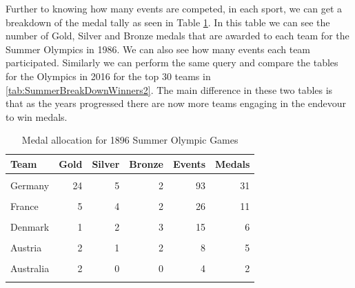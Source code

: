 \documentclass[
]{article}
\begin{document}
\newpage

Further to knowing how many events are competed, in each sport, we can get a breakdown of the medal tally as seen in Table \ref{tab:SummerBreakDownWinners1}. In this table we can see the number of Gold, Silver and Bronze medals that are awarded to each team for the Summer Olympics in 1986. We can also see how many events each team participated. Similarly we can perform the same query and compare the tables for the Olympics in 2016 for the top 30 teams in \ref{tab:SummerBreakDownWinners2}. The main difference in these two tables is that as the years progressed there are now more teams engaging in the endevour to win medals.

\begin{table}[H]
\centering
\caption{\label{tab:SummerBreakDownWinners1}Medal allocation for 1896 Summer Olympic Games}
\centering
\fontsize{7}{9}\selectfont
\begin{tabular}[t]{lrrrrr}
\toprule
Team & Gold & Silver & Bronze & Events & Medals\\
\midrule
\cellcolor{gray!10}{Greece} & \cellcolor{gray!10}{10} & \cellcolor{gray!10}{16} & \cellcolor{gray!10}{18} & \cellcolor{gray!10}{140} & \cellcolor{gray!10}{44}\\
Germany & 24 & 5 & 2 & 93 & 31\\
\cellcolor{gray!10}{United States} & \cellcolor{gray!10}{11} & \cellcolor{gray!10}{7} & \cellcolor{gray!10}{2} & \cellcolor{gray!10}{27} & \cellcolor{gray!10}{20}\\
France & 5 & 4 & 2 & 26 & 11\\
\cellcolor{gray!10}{Great Britain} & \cellcolor{gray!10}{2} & \cellcolor{gray!10}{3} & \cellcolor{gray!10}{2} & \cellcolor{gray!10}{23} & \cellcolor{gray!10}{7}\\
\addlinespace
Denmark & 1 & 2 & 3 & 15 & 6\\
\cellcolor{gray!10}{Hungary} & \cellcolor{gray!10}{2} & \cellcolor{gray!10}{1} & \cellcolor{gray!10}{3} & \cellcolor{gray!10}{18} & \cellcolor{gray!10}{6}\\
Austria & 2 & 1 & 2 & 8 & 5\\
\cellcolor{gray!10}{Switzerland} & \cellcolor{gray!10}{1} & \cellcolor{gray!10}{2} & \cellcolor{gray!10}{0} & \cellcolor{gray!10}{8} & \cellcolor{gray!10}{3}\\
Australia & 2 & 0 & 0 & 4 & 2\\
\addlinespace
\cellcolor{gray!10}{Australia/Great Britain} & \cellcolor{gray!10}{0} & \cellcolor{gray!10}{0} & \cellcolor{gray!10}{2} & \cellcolor{gray!10}{2} & \cellcolor{gray!10}{2}\\

\end{tabular}
\end{table}
\end{document}
